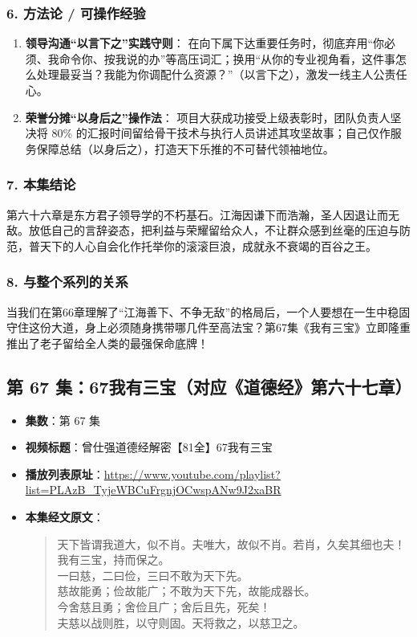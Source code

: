 \subsubsection{6. 方法论 / 可操作经验}
\begin{enumerate}
    \item \textbf{领导沟通“以言下之”实践守则}：
    在向下属下达重要任务时，彻底弃用“你必须、我命令你、按我说的办”等高压词汇；换用“从你的专业视角看，这件事怎么处理最妥当？我能为你调配什么资源？”（以言下之），激发一线主人公责任心。
    \item \textbf{荣誉分摊“以身后之”操作法}：
    项目大获成功接受上级表彰时，团队负责人坚决将 80\% 的汇报时间留给骨干技术与执行人员讲述其攻坚故事；自己仅作服务保障总结（以身后之），打造天下乐推的不可替代领袖地位。
\end{enumerate}

\subsubsection{7. 本集结论}
第六十六章是东方君子领导学的不朽基石。江海因谦下而浩瀚，圣人因退让而无敌。放低自己的言辞姿态，把利益与荣耀留给众人，不让群众感到丝毫的压迫与防范，普天下的人心自会化作托举你的滚滚巨浪，成就永不衰竭的百谷之王。

\subsubsection{8. 与整个系列的关系}
当我们在第66章理解了“江海善下、不争无敌”的格局后，一个人要想在一生中稳固守住这份大道，身上必须随身携带哪几件至高法宝？第67集《我有三宝》立即隆重推出了老子留给全人类的最强保命底牌！

\clearpage

\subsection{第 67 集：67我有三宝（对应《道德经》第六十七章）}
\label{sec:ep67}

\begin{itemize}
    \item \textbf{集数}：第 67 集
    \item \textbf{视频标题}：曾仕强道德经解密【81全】67我有三宝
    \item \textbf{播放列表原址}：\url{https://www.youtube.com/playlist?list=PLAzB_TyjeWBCuFrgnjOCwspANw9J2xaBR}
    \item \textbf{本集经文原文}：
    \begin{quote}\kaishu
    天下皆谓我道大，似不肖。夫唯大，故似不肖。若肖，久矣其细也夫！\\
    我有三宝，持而保之。\\
    一曰慈，二曰俭，三曰不敢为天下先。\\
    慈故能勇；俭故能广；不敢为天下先，故能成器长。\\
    今舍慈且勇；舍俭且广；舍后且先，死矣！\\
    夫慈以战则胜，以守则固。天将救之，以慈卫之。
    \end{quote}
\end{itemize}

